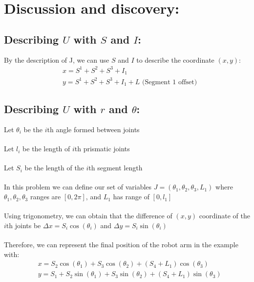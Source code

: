 \documentclass[11pt]{article}
\newcommand{\myalign}[1]{\begin{align*}#1\end{align*}}
\begin{document}
\section{Discussion and discovery:}



\subsection{Describing $U$ with $S$ and $I$:}

By the description of J, we can use $S$ and $I$ to describe the coordinate $(x, y)$:
\myalign{
  & x = S^1 + S^2 + S^3 + I_1 \\
  & y = S^1 + S^2 + S^3 + I_1 + L\text{ (Segment 1 offset)}
}
\subsection{Describing $U$ with $r$ and $\theta$:}
Let $\theta_i$ be the $i$th angle formed between joints \\
\\
Let $l_i$ be the length of $i$th prismatic joints \\
\\
Let $S_i$ be the length of the $i$th segment length \\
\\
In this problem we can define our set of variables $J = (\theta_1, \theta_2, \theta_3, L_1)$ where $\theta_1, \theta_2, \theta_3$ ranges are $[0, 2\pi]$, and $L_1$ has range of $[0, l_1]$ \\
\\
Using trigonometry, we can obtain that the difference of $(x,y)$ coordinate of the $i$th joints be $\Delta x = S_i \cos(\theta_i)$ and $\Delta y = S_i \sin(\theta_i)$ \\
\\
Therefore, we can represent the final position of the robot arm in the example with:
\myalign{
  & x = S_2\cos(\theta_1) + S_3\cos(\theta_2) + (S_4 + L_1)\cos(\theta_3) \\
  & y = S_1 + S_2\sin(\theta_1) + S_3\sin(\theta_2) + (S_4 + L_1)\sin(\theta_3) \\
}
\end{document}
